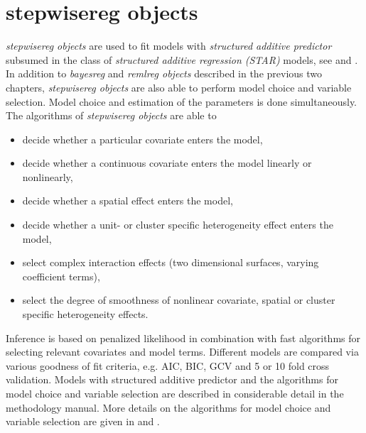 \chapter{stepwisereg objects}
\normalsize
\label{stepwisereg} 

{\em stepwisereg objects} are used to fit models with {\em structured additive predictor} subsumed in the class of {\em
structured additive regression (STAR)} models, see  and . In addition to {\em
bayesreg} and {\em remlreg objects} described in the previous two chapters, {\em stepwisereg objects} are also able to perform
model choice and variable selection. Model choice and estimation of the parameters is done simultaneously. The algorithms of
{\em stepwisereg objects} are able to
\begin{itemize}
\item decide whether a particular covariate enters the model,
\item decide whether a continuous covariate enters the model linearly or nonlinearly,
\item decide whether a spatial effect enters the model,
\item decide whether a unit- or cluster specific heterogeneity effect enters the model,
\item select complex interaction effects (two dimensional surfaces, varying coefficient terms),
\item select the degree of smoothness of  nonlinear covariate, spatial or cluster specific heterogeneity effects.
\end{itemize}
Inference is based on penalized likelihood in combination with fast algorithms for selecting relevant covariates and model
terms. Different models are compared via various goodness of fit criteria, e.g. AIC, BIC, GCV and 5 or 10 fold cross
validation. Models with structured additive predictor and the algorithms for model choice and variable selection are described
in considerable detail in the methodology manual. More details on the algorithms for model choice and variable selection are
given in  and .

     


